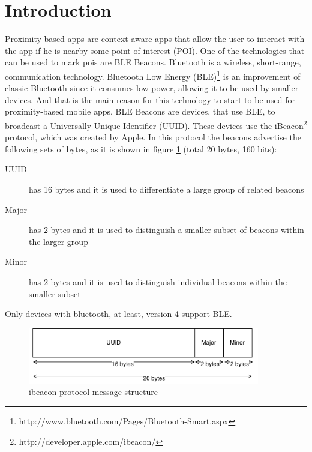 
\section{Introduction}
\label{sec:introduction}
Proximity-based apps are
context-aware apps that allow the user to interact
with the app if he is nearby some point of interest (POI).
One of the technologies that can be used to mark pois are BLE Beacons.
Bluetooth is a wireless, short-range, communication technology.
Bluetooth Low Energy (BLE)\footnote{http://www.bluetooth.com/Pages/Bluetooth-Smart.aspx}
is an improvement of classic Bluetooth since it consumes
low power, allowing it to be used by smaller devices.
And that is the main reason for this technology to start to
be used for proximity-based mobile apps,
BLE Beacons are devices, that use BLE, to broadcast a
Universally Unique Identifier (UUID).
These devices use the
iBeacon\footnote{http://developer.apple.com/ibeacon/}
protocol, which was created
by Apple\texttrademark. In this protocol the beacons
advertise the following sets of bytes, as it is shown in
figure \ref{fig:ibeacon}
(total 20 bytes, 160 bits):
\begin{description}
  \item[UUID] has 16 bytes and it is used to differentiate a
  large group of related beacons
  \item[Major] has 2 bytes and it is used to distinguish a smaller
  subset of beacons within the larger group
  \item[Minor] has 2 bytes and it is used to distinguish individual
  beacons within the smaller subset
\end{description}
Only devices with bluetooth, at least, version 4 support BLE.

\begin{figure}[!ht]
  \centering
    \includegraphics[width=0.9\textwidth]{figures/ibeacon}
    \caption{ibeacon protocol message structure}
    \label{fig:ibeacon}
\end{figure}


